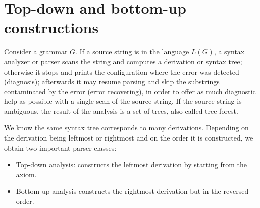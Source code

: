 \section{Top-down and bottom-up constructions}

Consider a grammar $G$. If a source string is in the language $L(G)$, a syntax analyzer or parser scans the string and computes a derivation or syntax tree; 
otherwise it stops and prints the configuration where the error was detected (diagnosis); afterwards it may resume parsing and skip the substrings contaminated 
by the error (error recovering), in order to offer as much diagnostic help as possible with a single scan of the source string. If the source string is ambiguous, 
the result of the analysis is a set of trees, also called tree forest. 

We know the same syntax tree corresponds to many derivations. Depending on the derivation being leftmost or rightmost and on the order it is constructed, we obtain 
two important parser classes: 
\begin{itemize}
    \item Top-down analysis: constructs the leftmost derivation by starting from the axiom.
    \item Bottom-up analysis constructs the rightmost derivation but in the reversed order.
\end{itemize}